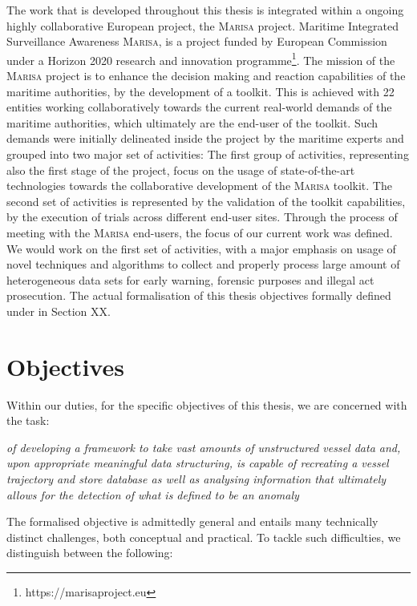 The work that is developed throughout this thesis is integrated within a ongoing highly collaborative European project, the \textsc{Marisa} project. Maritime Integrated Surveillance Awareness \textsc{Marisa}, is a project funded by European Commission under a Horizon 2020 research and innovation programme\footnote{https://marisaproject.eu}. The mission of the \textsc{Marisa} project is to enhance the decision making and reaction capabilities of the maritime authorities, by the development of a toolkit. 
This is achieved with 22 entities working collaboratively towards the current real-world demands of the maritime authorities, which ultimately are the end-user of the toolkit. Such demands were initially delineated inside the project by the maritime experts and grouped into two major set of activities: The first group of activities, representing also the first stage of the project, focus on the usage of state-of-the-art technologies towards the collaborative development of the \textsc{Marisa} toolkit. The second set of activities is represented by the validation of the toolkit capabilities, by the execution of trials across different end-user sites.  
Through the process of meeting with the \textsc{Marisa} end-users, the focus of our current work was defined. We would work on the first set of activities, with a major emphasis on usage of novel techniques and algorithms to collect and properly process large amount of heterogeneous data sets for early warning, forensic purposes and illegal act prosecution. The actual formalisation of this thesis objectives formally defined under in Section XX.

\section{Objectives}
Within our duties, for the specific objectives of this thesis, we are concerned with the task:

{\centering
\emph{
of developing a framework to take vast amounts of unstructured vessel data and, upon appropriate meaningful data structuring, is capable of recreating a vessel trajectory and store database as well as analysing information that ultimately allows for the detection of what is defined to be an anomaly}
}

The formalised objective is admittedly general and entails many technically distinct challenges, both conceptual and practical. To tackle such difficulties, we distinguish between the following:

